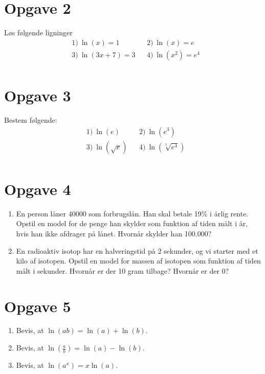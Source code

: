 \documentclass[12pt]{article}
\begin{document}
\section*{Opgave 2}
Løs følgende ligninger
\begin{align*}
&1) \ \ln(x)=1   &&2) \ \ln(x)=e    \\
&3) \ \ln(3x+7) = 3   &&4) \  \ln(x^2) = e^4   \\
\end{align*}
\section*{Opgave 3}
Bestem følgende:
\begin{align*}
&1) \  \ln(e)  &&2) \  \ln(e^3)    \\
&3) \  \ln(\sqrt{e})  &&4) \ \ln(\sqrt[5]{e^4})      \\
\end{align*}

\section*{Opgave 4}
\begin{enumerate}[label=\roman*)]
\item En person låner 40000 som forbrugslån. Han skal betale 19$\%$ i årlig rente. Opstil en model for de penge han skylder som funktion af tiden målt i år, hvis han ikke afdrager på lånet. Hvornår skylder han 100.000?
\item En radioaktiv isotop har en halveringstid på 2 sekunder, og vi starter med et kilo af isotopen. Opstil en model for massen af isotopen som funktion af tiden målt i sekunder. Hvornår er der 10 gram tilbage? Hvornår er der 0?
\end{enumerate}
\section*{Opgave 5}
\begin{enumerate}[label=\roman*)]
\item Bevis, at  $\ln(ab) = \ln(a)+\ln(b).$
\item Bevis, at  $\ln(\frac{a}{b}) = \ln(a)-\ln(b)$.
\item Bevis, at  $\ln(a^x) = x\ln(a)$.
\end{enumerate}
\end{document}
